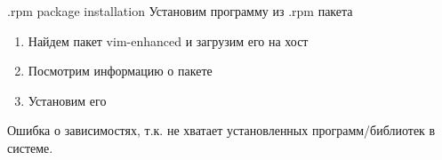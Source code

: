 \begin{frame}{.rpm package installation}
    Установим программу из .rpm пакета
    \begin{enumerate}
        \item Найдем пакет vim-enhanced и загрузим его на хост 
        \pause
        \item Посмотрим информацию о пакете
        \pause
        \item Установим его
        \pause
    \end{enumerate}
    Ошибка о зависимостях, т.к. не хватает установленных программ/библиотек в системе.
\end{frame}
